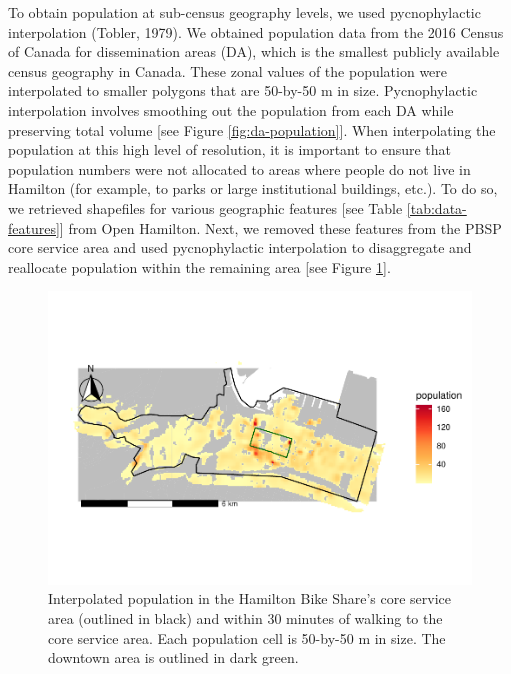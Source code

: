 \documentclass[]{elsarticle} %
\begin{document}
To obtain population at sub-census geography levels, we used
pycnophylactic interpolation (Tobler, 1979). We obtained population data
from the 2016 Census of Canada for dissemination areas (DA), which is
the smallest publicly available census geography in Canada. These zonal
values of the population were interpolated to smaller polygons that are
50-by-50 m in size. Pycnophylactic interpolation involves smoothing out
the population from each DA while preserving total volume {[}see Figure
\ref{fig:da-population}{]}. When interpolating the population at this
high level of resolution, it is important to ensure that population
numbers were not allocated to areas where people do not live in Hamilton
(for example, to parks or large institutional buildings, etc.). To do
so, we retrieved shapefiles for various geographic features {[}see Table
\ref{tab:data-features}{]} from Open Hamilton. Next, we removed these
features from the PBSP core service area and used pycnophylactic
interpolation to disaggregate and reallocate population within the
remaining area {[}see Figure \ref{fig:interpolated-population}{]}.

\begin{figure}

{\centering \includegraphics[width=0.9\linewidth]{Bike-share-spatial-equity_files/figure-latex/interpolated-population-1} 

}

\caption{Interpolated population in the Hamilton Bike Share's core service area (outlined in black) and within 30 minutes of walking to the core service area. Each population cell is 50-by-50 m in size. The downtown area is outlined in dark green.}\label{fig:interpolated-population}
\end{figure}
\end{document}
